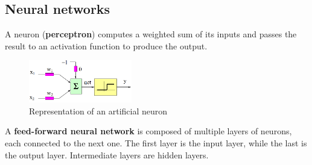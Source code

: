 \subsection{Neural networks}
A neuron (\textbf{perceptron}) computes a weighted sum of its inputs and 
passes the result to an activation function to produce the output.
\begin{figure}[h]
    \centering
    \includegraphics[width=0.40\textwidth]{img/neuron.png}
    \caption{Representation of an artificial neuron}
\end{figure}

A \textbf{feed-forward neural network} is composed of multiple layers of neurons, each connected to the next one.
The first layer is the input layer, while the last is the output layer.
Intermediate layers are hidden layers.

